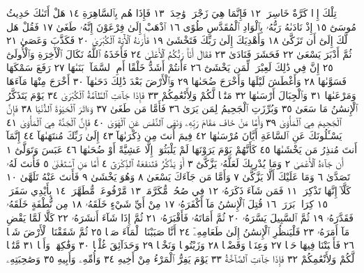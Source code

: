 تِلْكَ إِذࣰا كَرَّةٌ خَاسِرَةࣱ ١٢ فَإِنَّمَا هِيَ زَجْرَةࣱ وَٰحِدَةࣱ ١٣ فَإِذَا هُم بِٱلسَّاهِرَةِ ١٤
هَلْ أَتَىٰكَ حَدِيثُ مُوسَىٰٓ ١٥ إِذْ نَادَىٰهُ رَبُّهُۥ بِٱلْوَادِ ٱلْمُقَدَّسِ طُوًى ١٦
ٱذْهَبْ إِلَىٰ فِرْعَوْنَ إِنَّهُۥ طَغَىٰ ١٧ فَقُلْ هَل لَّكَ إِلَىٰٓ أَن تَزَكَّىٰ ١٨
وَأَهْدِيَكَ إِلَىٰ رَبِّكَ فَتَخْشَىٰ ١٩ فَأَرَىٰهُ ٱلْأٓيَةَ ٱلْكُبْرَىٰ ٢٠
فَكَذَّبَ وَعَصَىٰ ٢١ ثُمَّ أَدْبَرَ يَسْعَىٰ ٢٢ فَحَشَرَ فَنَادَىٰ ٢٣
فَقَالَ أَنَا۠ رَبُّكُمُ ٱلْأَعْلَىٰ ٢٤ فَأَخَذَهُ ٱللَّهُ نَكَالَ ٱلْأٓخِرَةِ وَٱلْأُولَىٰٓ ٢٥
إِنَّ فِي ذَٰلِكَ لَعِبْرَةࣰ لِّمَن يَخْشَىٰٓ ٢٦ ءَأَنتُمْ أَشَدُّ خَلْقًا أَمِ ٱلسَّمَآءُۚ
بَنَىٰهَا ٢٧ رَفَعَ سَمْكَهَا فَسَوَّىٰهَا ٢٨ وَأَغْطَشَ لَيْلَهَا وَأَخْرَجَ
ضُحَىٰهَا ٢٩ وَٱلْأَرْضَ بَعْدَ ذَٰلِكَ دَحَىٰهَآ ٣٠ أَخْرَجَ مِنْهَا مَآءَهَا
وَمَرْعَىٰهَا ٣١ وَٱلْجِبَالَ أَرْسَىٰهَا ٣٢ مَتَٰعࣰا لَّكُمْ وَلِأَنْعَٰمِكُمْ ٣٣
فَإِذَا جَآءَتِ ٱلطَّآمَّةُ ٱلْكُبْرَىٰ ٣٤ يَوْمَ يَتَذَكَّرُ ٱلْإِنسَٰنُ مَا سَعَىٰ ٣٥
وَبُرِّزَتِ ٱلْجَحِيمُ لِمَن يَرَىٰ ٣٦ فَأَمَّا مَن طَغَىٰ ٣٧ وَءَاثَرَ ٱلْحَيَوٰةَ
ٱلدُّنْيَا ٣٨ فَإِنَّ ٱلْجَحِيمَ هِيَ ٱلْمَأْوَىٰ ٣٩ وَأَمَّا مَنْ خَافَ مَقَامَ
رَبِّهِۦ وَنَهَى ٱلنَّفْسَ عَنِ ٱلْهَوَىٰ ٤٠ فَإِنَّ ٱلْجَنَّةَ هِيَ ٱلْمَأْوَىٰ ٤١
يَسْـَٔلُونَكَ عَنِ ٱلسَّاعَةِ أَيَّانَ مُرْسَىٰهَا ٤٢ فِيمَ أَنتَ مِن
ذِكْرَىٰهَآ ٤٣ إِلَىٰ رَبِّكَ مُنتَهَىٰهَآ ٤٤ إِنَّمَآ أَنتَ مُنذِرُ مَن يَخْشَىٰهَا ٤٥
كَأَنَّهُمْ يَوْمَ يَرَوْنَهَا لَمْ يَلْبَثُوٓا۟ إِلَّا عَشِيَّةً أَوْ ضُحَىٰهَا ٤٦
عَبَسَ وَتَوَلَّىٰٓ ١ أَن جَآءَهُ ٱلْأَعْمَىٰ ٢ وَمَا يُدْرِيكَ لَعَلَّهُۥ يَزَّكَّىٰٓ ٣ أَوْ يَذَّكَّرُ
فَتَنفَعَهُ ٱلذِّكْرَىٰٓ ٤ أَمَّا مَنِ ٱسْتَغْنَىٰ ٥ فَأَنتَ لَهُۥ تَصَدَّىٰ ٦ وَمَا عَلَيْكَ
أَلَّا يَزَّكَّىٰ ٧ وَأَمَّا مَن جَآءَكَ يَسْعَىٰ ٨ وَهُوَ يَخْشَىٰ ٩ فَأَنتَ عَنْهُ تَلَهَّىٰ ١٠
كَلَّآ إِنَّهَا تَذْكِرَةࣱ ١١ فَمَن شَآءَ ذَكَرَهُۥ ١٢ فِي صُحُفࣲ مُّكَرَّمَةࣲ ١٣ مَّرْفُوعَةࣲ
مُّطَهَّرَةِۭ ١٤ بِأَيْدِي سَفَرَةࣲ ١٥ كِرَامِۭ بَرَرَةࣲ ١٦ قُتِلَ ٱلْإِنسَٰنُ مَآ أَكْفَرَهُۥ ١٧ مِنْ
أَيِّ شَيْءٍ خَلَقَهُۥ ١٨ مِن نُّطْفَةٍ خَلَقَهُۥ فَقَدَّرَهُۥ ١٩ ثُمَّ ٱلسَّبِيلَ يَسَّرَهُۥ ٢٠
ثُمَّ أَمَاتَهُۥ فَأَقْبَرَهُۥ ٢١ ثُمَّ إِذَا شَآءَ أَنشَرَهُۥ ٢٢ كَلَّا لَمَّا يَقْضِ مَآ أَمَرَهُۥ ٢٣
فَلْيَنظُرِ ٱلْإِنسَٰنُ إِلَىٰ طَعَامِهِۦٓ ٢٤ أَنَّا صَبَبْنَا ٱلْمَآءَ صَبࣰّا ٢٥ ثُمَّ شَقَقْنَا
ٱلْأَرْضَ شَقࣰّا ٢٦ فَأَنۢبَتْنَا فِيهَا حَبࣰّا ٢٧ وَعِنَبࣰا وَقَضْبࣰا ٢٨ وَزَيْتُونࣰا وَنَخْلࣰا ٢٩
وَحَدَآئِقَ غُلْبࣰا ٣٠ وَفَٰكِهَةࣰ وَأَبࣰّا ٣١ مَّتَٰعࣰا لَّكُمْ وَلِأَنْعَٰمِكُمْ ٣٢ فَإِذَا جَآءَتِ
ٱلصَّآخَّةُ ٣٣ يَوْمَ يَفِرُّ ٱلْمَرْءُ مِنْ أَخِيهِ ٣٤ وَأُمِّهِۦ وَأَبِيهِ ٣٥ وَصَٰحِبَتِهِۦ
